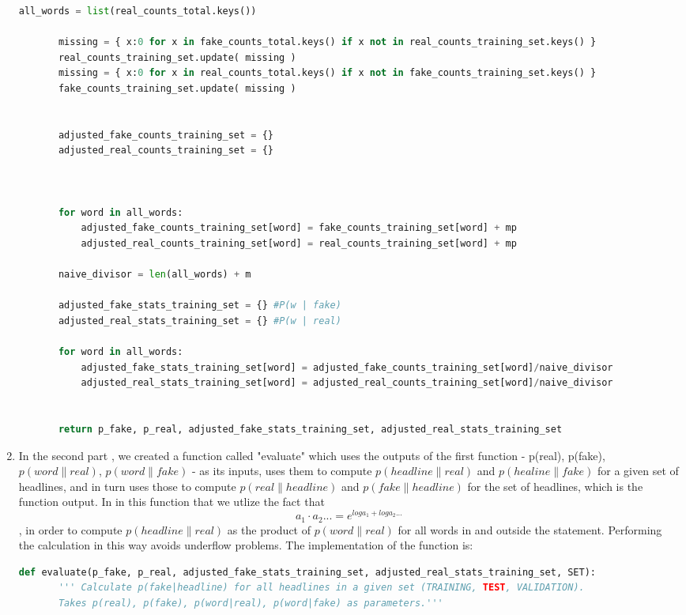 \documentclass{article}
\begin{document}
\begin{enumerate}
\begin{lstlisting}[language=Python]
       all_words = list(real_counts_total.keys())

       missing = { x:0 for x in fake_counts_total.keys() if x not in real_counts_training_set.keys() }
       real_counts_training_set.update( missing )
       missing = { x:0 for x in real_counts_total.keys() if x not in fake_counts_training_set.keys() }
       fake_counts_training_set.update( missing )


       adjusted_fake_counts_training_set = {}
       adjusted_real_counts_training_set = {}



       for word in all_words:
           adjusted_fake_counts_training_set[word] = fake_counts_training_set[word] + mp
           adjusted_real_counts_training_set[word] = real_counts_training_set[word] + mp

       naive_divisor = len(all_words) + m

       adjusted_fake_stats_training_set = {} #P(w | fake)
       adjusted_real_stats_training_set = {} #P(w | real)

       for word in all_words:
           adjusted_fake_stats_training_set[word] = adjusted_fake_counts_training_set[word]/naive_divisor
           adjusted_real_stats_training_set[word] = adjusted_real_counts_training_set[word]/naive_divisor


       return p_fake, p_real, adjusted_fake_stats_training_set, adjusted_real_stats_training_set

      \end{lstlisting}


   \item
   In the second part , we created a function called "evaluate" which uses the outputs of the first function -  p(real), p(fake), $p(word\|real)$, $p(word\|fake)$ - as its inputs, uses them to compute $p(headline\|real)$ and $p(healine\|fake)$ for a given
   set of headlines, and in turn uses those to compute $p(real\|headline)$ and $p(fake\|headline)$ for the set of headlines, which is the function output. In in this function that we utlize the fact that \begin{equation}a_1 \cdot a_2 ...=  e^{log{a_1} + log{a_2} ...} \end{equation}, in order to compute
   $p(headline\|real)$ as the product of $p(word\|real)$ for all words in and outside the statement. Performing the calculation in this way avoids underflow problems.
   The implementation of the function is:
   \begin{lstlisting}[language=Python]
   def evaluate(p_fake, p_real, adjusted_fake_stats_training_set, adjusted_real_stats_training_set, SET):
       ''' Calculate p(fake|headline) for all headlines in a given set (TRAINING, TEST, VALIDATION).
       Takes p(real), p(fake), p(word|real), p(word|fake) as parameters.'''


\end{lstlisting}
\end{enumerate}
\end{document}
